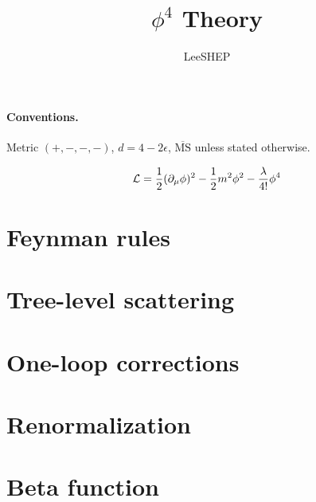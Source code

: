 \documentclass[11pt]{article}
\title{$\phi^4$ Theory}
\author{LeeSHEP}
\date{}
\begin{document}
\maketitle

\paragraph{Conventions.} Metric $(+,-,-,-)$, $d = 4 - 2\epsilon$, $\overline{\text{MS}}$ unless stated otherwise.

\begin{equation}
  \mathcal{L} = \frac{1}{2}(\partial_\mu\phi)^2 - \frac{1}{2}m^2\phi^2 - \frac{\lambda}{4!}\phi^4
\end{equation}

\section{Feynman rules}
\section{Tree-level scattering}
\section{One-loop corrections}
\section{Renormalization}
\section{Beta function}
\end{document}
